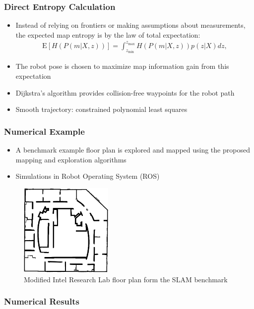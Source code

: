 \documentclass[11pt,professionalfonts,hyperref={pdftex,pdfpagemode=none,pdfstartview=FitH}]{beamer}
\renewcommand{\emph}[1]{\textit{\textbf{\color{blue}{#1}}}}
\begin{document}
\begin{frame}
\frametitle{Direct Entropy Calculation}
\begin{itemize}
        	\item Instead of relying on frontiers or making assumptions about measurements, the expected map entropy is \emph{calculated directly} by the law of total expectation:
	\begin{align*}
		\text{E}[H(P(m|X,z))]=\int_{z_\text{min}}^{z_\text{max}}
		H(P(m|X,z))p(z|X)dz,
	\end{align*}
	\item The robot pose is chosen to maximize map information gain from this expectation
	\item Dijkstra's algorithm provides collision-free waypoints for the robot path
	\item Smooth trajectory: constrained polynomial least squares 
\end{itemize}


\end{frame}


\begin{frame}
\frametitle{Numerical Example}
\begin{itemize}
        	\item A benchmark example floor plan is explored and mapped using the proposed mapping and exploration algorithms
	\item Simulations in Robot Operating System (ROS)
\end{itemize}
\begin{figure}
    \centering
    \includegraphics[width=0.4\textwidth]{intel_clean.png}
    \caption*{Modified Intel Research Lab floor plan form the SLAM benchmark}
\end{figure}

\end{frame}

\begin{frame}
\frametitle{Numerical Results}
\end{frame}
\end{document}
